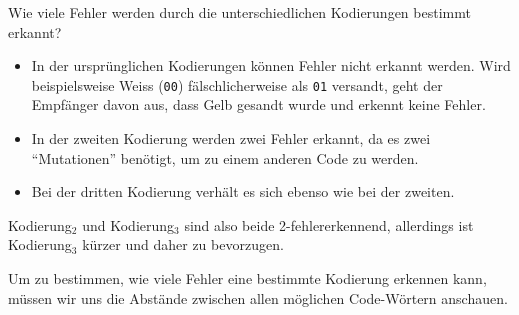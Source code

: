 \begin{myexample}
	Wie viele Fehler werden durch die unterschiedlichen Kodierungen bestimmt erkannt?
	\begin{itemize}
		\item In der ursprünglichen Kodierungen können Fehler nicht erkannt werden. Wird beispielsweise Weiss (\texttt{00}) fälschlicherweise als \texttt{01} versandt, geht der Empfänger davon aus, dass Gelb gesandt wurde und erkennt keine Fehler.
		\item In der zweiten Kodierung werden zwei Fehler erkannt, da es zwei \enquote{Mutationen} benötigt, um zu einem anderen Code zu werden.
		\item Bei der dritten Kodierung verhält es sich ebenso wie bei der zweiten.
	\end{itemize}
	Kodierung\(_2\) und Kodierung\(_3\) sind also beide 2-fehlererkennend, allerdings ist Kodierung\(_3\) kürzer und daher zu bevorzugen.
\end{myexample}

Um zu bestimmen, wie viele Fehler eine bestimmte Kodierung erkennen kann, müssen wir uns die Abstände zwischen allen möglichen Code-Wörtern anschauen.




